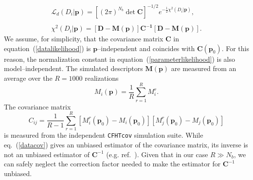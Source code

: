 \documentclass[reprint,aps,prd,superscriptaddress,showkeys,showpacs]{revtex4-1}
\begin{document}
%


\begin{equation}
\label{datalikelihood}
\begin{matrix}
\mathcal{L}_d(D_i\vert \mathbf{p}) = [(2\pi)^{N_b}\det{\mathbf{C}}]^{-1/2} e^{-\frac{1}{2}\chi^2(D_i\vert \mathbf{p})}, \\ \\
\chi^2(D_i\vert \mathbf{p}) = \mathbf{[D - M(p)]C^{-1}[D-M(p)]}.
\end{matrix}
\end{equation} 
%
We assume, for simplicity, that the covariance matrix $\mathbf{C}$ in
equation~(\ref{datalikelihood}) is $\mathbf{p}$--independent and
coincides with $\mathbf{C}(\mathbf{p}_0)$. For this reason, the
normalization constant in equation~(\ref{parameterlikelihood}) is also
model--independent. The simulated descriptors $\mathbf{M(p)}$ are
measured from an average over the $R=1000$ realizations
\begin{equation}
M_i(\mathbf{p}) = \frac{1}{R}\sum_{r=1}^R M_i^r .
\end{equation}
%
The covariance matrix 
\begin{equation}
\label{datacov}
C_{ij} = \frac{1}{R-1} \sum_{r=1}^R [M_i^r(\mathbf{p}_0)-M_i(\mathbf{p}_0)][M_j^r(\mathbf{p}_0)-M_j(\mathbf{p}_0)]
\end{equation}
%
is measured from the independent \texttt{CFHTcov} simulation suite.
While eq.~(\ref{datacov}) gives an unbiased estimator of the
covariance matrix, its inverse is not an unbiased estimator of
$\mathbf{C}^{-1}$ (e.g. ref.~\citep{RayTracingHartlap}). Given that in
our case $R\gg N_b$, we can safely neglect the correction factor
needed to make the estimator for $\mathbf{C}^{-1}$ unbiased.
\end{document}
